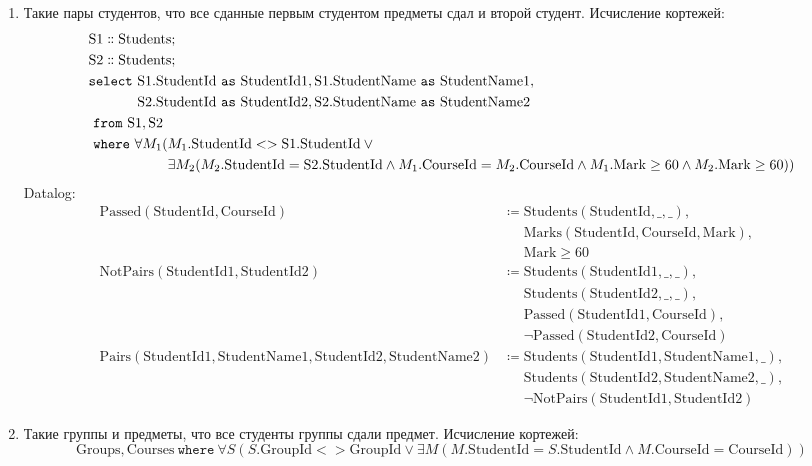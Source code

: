 \documentclass{article}
\newcommand{\Students}{\mathrm{Students}}
\newcommand{\Sq}{\mathrm{S1}}
\newcommand{\Sw}{\mathrm{S2}}
\newcommand{\Sqi}{\mathrm{StudentId1}}
\newcommand{\Swi}{\mathrm{StudentId2}}
\newcommand{\Sqn}{\mathrm{StudentName1}}
\newcommand{\Swn}{\mathrm{StudentName2}}
\newcommand{\StudentId}{\mathrm{StudentId}}
\newcommand{\StudentName}{\mathrm{StudentName}}
\newcommand{\Groups}{\mathrm{Groups}}
\newcommand{\GroupId}{\mathrm{GroupId}}
\newcommand{\Courses}{\mathrm{Courses}}
\newcommand{\CourseId}{\mathrm{CourseId}}
\newcommand{\Marks}{\mathrm{Marks}}
\newcommand{\Mark}{\mathrm{Mark}}
\newcommand{\select}{\mathtt{select}~}
\newcommand{\from}{~\mathtt{from}~}
\newcommand{\as}{~\mathtt{as}~}
\newcommand{\where}{~\mathtt{where}~}
\newcommand{\poloneq}{\mathrel{\phantom{\coloneq}}}
\begin{document}
\begin{enumerate}
    \item Такие пары студентов,
        что все сданные первым студентом предметы сдал и второй студент.
    Исчисление кортежей:
    \begin{align*}
        &\Sq \dblcolon \Students; \\
        &\Sw \dblcolon \Students; \\
        &\select \Sq.\StudentId \as \mathrm{StudentId1},
                 \Sq.\StudentName \as \mathrm{StudentName1}, \\
        &\phantom{\select} \Sw.\StudentId \as \mathrm{StudentId2},
                           \Sw.\StudentName \as \mathrm{StudentName2} \\
        &\from \Sq, \Sw \\
        &\where \forall M_1 (M_1.\StudentId <> \Sq.\StudentId \lor \phantom{q}\\
        &\phantom{\where \forall M_1 (}
            \exists M_2 (M_2.\StudentId = \Sw.\StudentId
            \land M_1.\CourseId = M_2.\CourseId
            \land M_1.\Mark \geq 60
            \land M_2.\Mark \geq 60))
    \end{align*}
    Datalog:
    \begin{align*}
        \mathrm{Passed}(\StudentId, \CourseId)
        &\coloneq \Students(\StudentId, \_, \_), \\
        &\poloneq \Marks(\StudentId, \CourseId, \Mark), \\
        &\poloneq \Mark \geq 60 \\
        \mathrm{NotPairs}(\Sqi, \Swi)
        &\coloneq \Students(\Sqi, \_, \_), \\
        &\poloneq \Students(\Swi, \_, \_), \\
        &\poloneq \mathrm{Passed}(\Sqi, \CourseId), \\
        &\poloneq \neg \mathrm{Passed}(\Swi, \CourseId) \\
        \mathrm{Pairs}(\Sqi, \Sqn, \Swi, \Swn)
        &\coloneq \Students(\Sqi, \Sqn, \_), \\
        &\poloneq \Students(\Swi, \Swn, \_), \\
        &\poloneq \neg \mathrm{NotPairs}(\Sqi, \Swi)
    \end{align*}
    \item Такие группы и предметы, что все студенты группы сдали предмет.
    Исчисление кортежей:
    \[
        \Groups, \Courses \where
        \forall S (S.\GroupId <> \GroupId
        \lor \exists M (M.\StudentId = S.\StudentId
        \land M.\CourseId = \CourseId))
\]
\end{enumerate}
\end{document}
